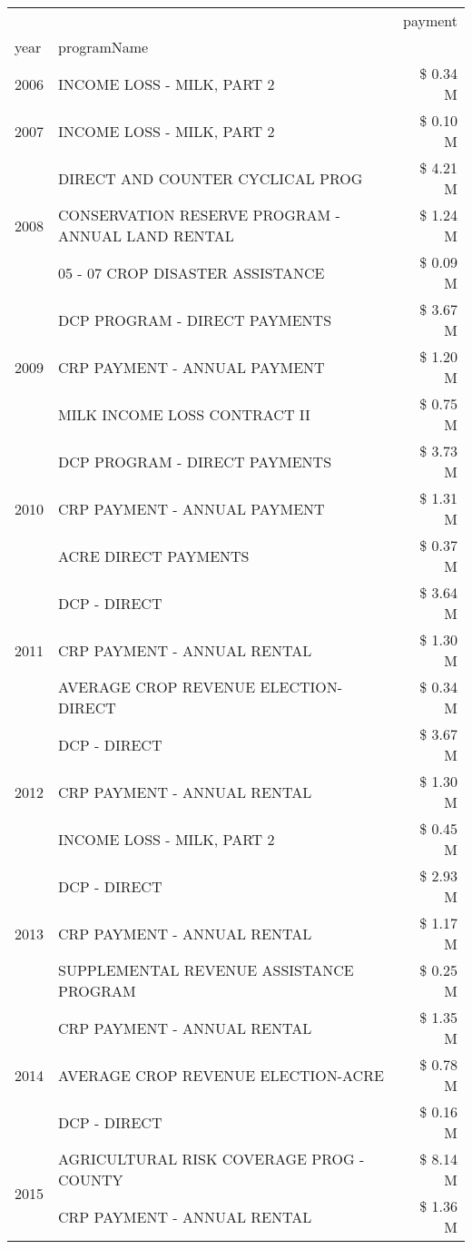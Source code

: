\begin{tabular}{llr}
\toprule
 &  & payment \\
year & programName &  \\
\midrule
2006 & INCOME LOSS - MILK, PART 2 & \$ 0.34 M \\
\cline{1-3}
2007 & INCOME LOSS - MILK, PART 2 & \$ 0.10 M \\
\cline{1-3}
\multirow[t]{3}{*}{2008} & DIRECT AND COUNTER CYCLICAL PROG & \$ 4.21 M \\
 & CONSERVATION RESERVE PROGRAM - ANNUAL LAND RENTAL & \$ 1.24 M \\
 & 05 - 07 CROP DISASTER ASSISTANCE & \$ 0.09 M \\
\cline{1-3}
\multirow[t]{3}{*}{2009} & DCP PROGRAM - DIRECT PAYMENTS & \$ 3.67 M \\
 & CRP PAYMENT - ANNUAL PAYMENT & \$ 1.20 M \\
 & MILK INCOME LOSS CONTRACT II & \$ 0.75 M \\
\cline{1-3}
\multirow[t]{3}{*}{2010} & DCP PROGRAM - DIRECT PAYMENTS & \$ 3.73 M \\
 & CRP PAYMENT - ANNUAL PAYMENT & \$ 1.31 M \\
 & ACRE DIRECT PAYMENTS & \$ 0.37 M \\
\cline{1-3}
\multirow[t]{3}{*}{2011} & DCP - DIRECT & \$ 3.64 M \\
 & CRP PAYMENT - ANNUAL RENTAL & \$ 1.30 M \\
 & AVERAGE CROP REVENUE ELECTION-DIRECT & \$ 0.34 M \\
\cline{1-3}
\multirow[t]{3}{*}{2012} & DCP - DIRECT & \$ 3.67 M \\
 & CRP PAYMENT - ANNUAL RENTAL & \$ 1.30 M \\
 & INCOME LOSS - MILK, PART 2 & \$ 0.45 M \\
\cline{1-3}
\multirow[t]{3}{*}{2013} & DCP - DIRECT & \$ 2.93 M \\
 & CRP PAYMENT - ANNUAL RENTAL & \$ 1.17 M \\
 & SUPPLEMENTAL REVENUE ASSISTANCE PROGRAM & \$ 0.25 M \\
\cline{1-3}
\multirow[t]{3}{*}{2014} & CRP PAYMENT - ANNUAL RENTAL & \$ 1.35 M \\
 & AVERAGE CROP REVENUE ELECTION-ACRE & \$ 0.78 M \\
 & DCP - DIRECT & \$ 0.16 M \\
\cline{1-3}
\multirow[t]{3}{*}{2015} & AGRICULTURAL RISK COVERAGE PROG - COUNTY & \$ 8.14 M \\
 & CRP PAYMENT - ANNUAL RENTAL & \$ 1.36 M \\

\end{tabular}
